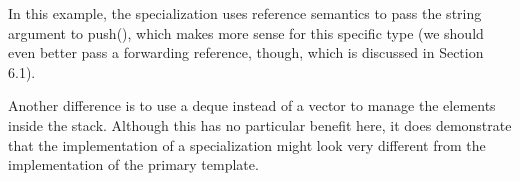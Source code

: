 In this example, the specialization uses reference semantics to pass the string argument to push(), which makes more sense for this specific type (we should even better pass a forwarding reference, though, which is discussed in Section 6.1).

Another difference is to use a deque instead of a vector to manage the elements inside the stack. Although this has no particular benefit here, it does demonstrate that the implementation of a specialization might look very different from the implementation of the primary template.





















